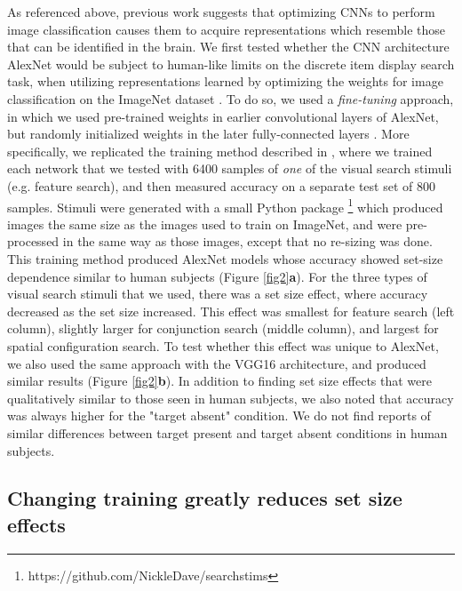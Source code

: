\documentclass[10pt,letterpaper]{article}
\begin{document}
As referenced above, previous work suggests that optimizing CNNs to perform image 
classification causes them to acquire representations which resemble those that can 
be identified in the brain. We first tested whether the CNN architecture AlexNet 
\cite{krizhevskyImagenetClassificationDeep2012}
would be subject to human-like limits on the discrete item display search task, 
when utilizing representations learned by optimizing the weights for image classification 
on the ImageNet dataset \cite{dengImagenetLargescaleHierarchical2009}. 
To do so, we used a \emph{fine-tuning} approach, in which we used pre-trained weights in earlier 
convolutional layers of AlexNet, but randomly initialized weights in the later 
fully-connected layers \cite{yosinskiHowTransferableAre2014}.
More specifically, we replicated the training method described in
\cite{poderCapacityLimitationsVisual2017}, where we trained each network that we tested with 
6400 samples of \emph{one} of the visual search stimuli (e.g. feature search), and then 
measured accuracy on a separate test set of 800 samples. Stimuli were generated with a 
small Python package \footnote{https://github.com/NickleDave/searchstims} 
which produced images the same size as the images used to train on 
ImageNet, and were pre-processed in the same way as those images, 
except that no re-sizing was done.
This training method produced AlexNet models whose accuracy showed set-size dependence 
similar to human subjects (Figure \ref{fig2}\textbf{a}). 
For the three types of visual search stimuli that we used, there was a set size effect,
where accuracy decreased as the set size increased. 
This effect was smallest for feature search (left column), slightly 
larger for conjunction search (middle column), and largest for spatial configuration 
search. To test whether this effect was unique to AlexNet, we also used the same approach 
with the VGG16 architecture, and produced similar results (Figure \ref{fig2}\textbf{b}). 
In addition to finding set size effects that were qualitatively 
similar to those seen in human subjects, we also noted that accuracy was always higher 
for the "target absent" condition. We do not find reports of similar differences between 
target present and target absent conditions in human subjects.



\subsection{Changing training greatly reduces set size effects}
\end{document}
